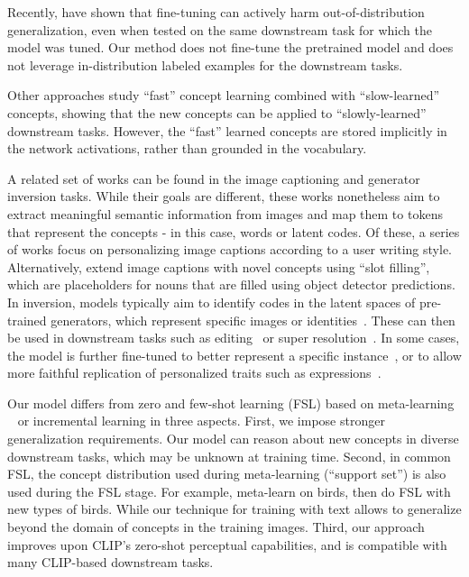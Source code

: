 \documentclass[runningheads]{llncs}
\begin{document}
Recently, \cite{wortsman2021robust,kumar2022fine,hewitt2021ensembles} have shown that fine-tuning can actively harm out-of-distribution generalization, even when tested on the same downstream task for which the model was tuned. 
Our method does not fine-tune the pretrained model and does not leverage in-distribution labeled examples for the downstream tasks. 

Other approaches \cite{tsimpoukelli2021multimodal,hill2020grounded} study ``fast'' concept learning combined with ``slow-learned'' concepts, showing that the new concepts can be applied to ``slowly-learned'' downstream tasks. However, the ``fast'' learned concepts are stored implicitly in the network activations, rather than grounded in the  vocabulary. 

A related set of works can be found in the image captioning and generator inversion tasks. While their goals are different, these works nonetheless aim to extract meaningful semantic information from images and map them to tokens that represent the concepts - in this case, words or latent codes. Of these, a series of works \cite{chunseong2017attend,denton2015user,feng2017personalized,del2020ratt,jia2020personalized,long2020cross,shuster2019engaging} focus on personalizing image captions according to a user writing style. Alternatively,  \cite{hendricks2016deep,venugopalan2017captioning,wu2018decoupled,zheng2019intention,lu2018neural,demirel2019image} extend image captions with novel concepts using ``slot filling'', which are placeholders for nouns that are filled using object detector predictions. In inversion, models typically aim to identify codes in the latent spaces of pre-trained generators, which represent specific images or identities~\cite{abdal2019image2stylegan,richardson2021encoding}. These can then be used in downstream tasks such as editing~\cite{shen2020interfacegan,abdal2021styleflow} or super resolution~\cite{menon2020pulse}. In some cases, the model is further fine-tuned to better represent a specific instance~\cite{roich2021pivotal,alaluf2022hyperstyle,dinh2022hyperinverter,tzaban2022stitch}, or to allow more faithful replication of personalized traits such as expressions~\cite{nitzan2022mystyle}.





Our model differs  from zero and few-shot learning (FSL) based on meta-learning ~\cite{finn2017model,vinyals2016matching,sung2018learning,snell2017prototypical,chen2021meta,DAP,ALE,xianCVPR,LAGO,COSMO,ZEST} or incremental learning    \cite{tao2020few,fan2021flar,ren2020wandering,cheraghian2021semantic,khan2021personalizing,wu2021striking} in three aspects. First, we impose stronger generalization requirements. Our model can reason about new concepts in diverse downstream tasks, which may be unknown at training time. Second, in common FSL, the concept distribution used during meta-learning (``support set'') is also used during the FSL stage. For example, meta-learn on birds, then do FSL with new types of birds. While our technique for training with text allows to generalize beyond the domain of concepts in the training images.
Third, our approach improves upon CLIP's zero-shot perceptual capabilities, and is compatible with many CLIP-based downstream tasks. 
\end{document}
